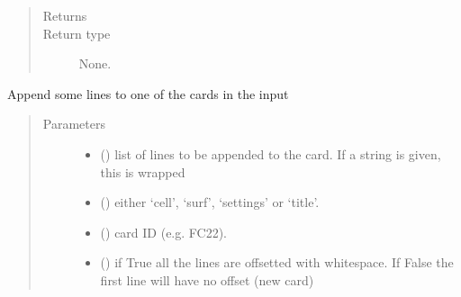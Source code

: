 \documentclass[letterpaper,10pt,english]{sphinxmanual}
\begin{document}
\begin{fulllineitems}
\begin{fulllineitems}
\begin{quote}
\begin{description}
\begin{itemize}
\end{itemize}

\item[{Returns}] \leavevmode


\item[{Return type}] \leavevmode
None.

\end{description}\end{quote}

\end{fulllineitems}


\begin{fulllineitems}
\label{\detokenize{api/inputgeneration:inputfile.InputFile.addlines2card}}
Append some lines to one of the cards in the input
\begin{quote}\begin{description}
\item[{Parameters}] \leavevmode\begin{itemize}
\item {} 
 () \textendash{} list of lines to be appended to the card. If a string is given,
this is wrapped

\item {} 
 () \textendash{} either ‘cell’, ‘surf’, ‘settings’ or ‘title’.

\item {} 
 () \textendash{} card ID (e.g. FC22).

\item {} 
 (\sphinxstyleliteralemphasis{\sphinxupquote{, }}) \textendash{} if True all the lines are off\sphinxhyphen{}setted with whitespace. If False
the first line will have no offset (new card)


\end{itemize}
\end{description}
\end{quote}
\end{fulllineitems}
\end{fulllineitems}
\end{document}
